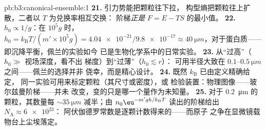 \begin{solution}{pb:b3:canonical-ensemble:1}
\textbf{21.} 引力势能把颗粒往下拉，
构型熵把颗粒往上扩散，二者以 $T$ 为兑换率相互交换：
阶梯\emph{正是} $F = E - TS$ 的最小值。
\textbf{22.} $h_0 \propto 1/g$：在 $10^5g$ 时，
$h_0 = k_{\text{B}}T/(m'\times10^5g) = \num{4.04e-21}/
\num{9.8e-17} \approx \qty{40}{\micro m}$，对于蛋白质——
即沉降平衡，佩兰的实验如今
已是生物化学系中的日常实验。
\textbf{23.} 从“过高”（$h_0 \gg$ 视场深度，看不出
梯度）到“过薄”（$h_0 \lesssim r$）：
可用半径大致在 $0.1$--$\qty{0.5}{\micro m}$ 之间——佩兰的选择并非
侥幸，而是精心设计。
\textbf{24.} 既然 $k_{\text{B}}$ 已由定义精确给定，
同一实验可用来标定颗粒（其尺寸或密度），或
检验装置：物理图像——玻尔兹曼阶梯——并未
改变，变的只是哪一个量作为未知量。
\textbf{25.} 对于 \qty{0.2}{\micro m} 的颗粒，其数量每
$\sim\qty{35}{\micro m}$ 减半；由 $n_0\eu^{-m'gh/k_{\text{B}}
T}$ 读出的阶梯给出 $N_{\text{A}} \approx \num{6e23}$：
阿伏伽德罗常数是逐颗计数得来的——而原子
之争在显微镜载物台上尘埃落定。
\end{solution}
